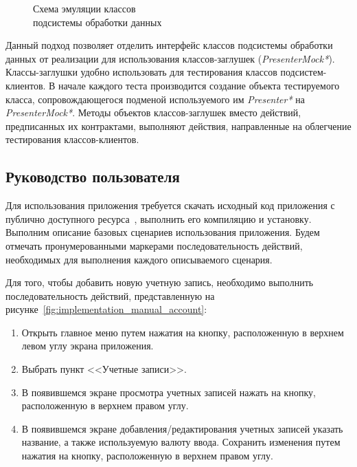 \begin{figure}[h!]
  \centering
  \caption{Схема эмуляции классов \\ подсистемы обработки данных}
  \label{fig:implementation_testing_presenter}
\end{figure}

Данный подход позволяет
отделить интерфейс классов подсистемы обработки данных от реализации
для использования классов-заглушек (\textit{PresenterMock*}).
Классы-заглушки удобно использовать для тестирования классов подсистем-клиентов.
В начале каждого теста производится создание объекта тестируемого класса,
сопровождающегося подменой используемого им \textit{Presenter*}
на \textit{PresenterMock*}.
Методы объектов классов-заглушек вместо действий, предписанных их контрактами,
выполняют действия, направленные на облегчение тестирования классов-клиентов.

\subsection{Руководство пользователя}

Для использования приложения требуется скачать исходный код
приложения с публично доступного ресурса~\cite{github_money_keeper},
выполнить его компиляцию и установку.
Выполним описание базовых сценариев использования приложения.
Будем отмечать пронумерованными маркерами последовательность действий,
необходимых для выполнения каждого описываемого сценария.

Для того, чтобы добавить новую учетную запись, необходимо выполнить
последовательность действий, представленную на
рисунке~\ref{fig:implementation_manual_account}:
\begin{enumerate}
  \item Открыть главное меню путем нажатия на кнопку,
    расположенную в верхнем левом углу экрана приложения.
  \item
    Выбрать пункт <<Учетные записи>>.
  \item В появившемся экране просмотра учетных записей
    нажать на кнопку, расположенную в верхнем правом углу.
  \item В появившемся экране добавления/редактирования
    учетных записей указать название, а также используемую валюту ввода.
    Сохранить изменения путем нажатия на кнопку, расположенную
    в верхнем правом углу.
\end{enumerate}

